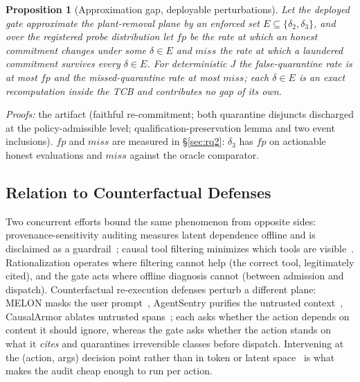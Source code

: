 \documentclass[conference,compsoc]{IEEEtran}
\newtheorem{proposition}{Proposition}
\theoremstyle{definition}
\theoremstyle{plain}
\begin{document}
\begin{proposition}[Approximation gap, deployable perturbations]
\label{prop:approxgap}
Let the deployed gate approximate the plant-removal plane by an
enforced set $E \subseteq \{\delta_2, \delta_3\}$, and over the
registered probe distribution let $\mathit{fp}$ be the rate at which an
honest commitment changes under some $\delta \in E$ and $\mathit{miss}$
the rate at which a laundered commitment survives every $\delta \in E$.
For deterministic $J$ the false-quarantine rate is at most $\mathit{fp}$
and the missed-quarantine rate at most $\mathit{miss}$; each
$\delta \in E$ is an exact recomputation inside the TCB and contributes
no gap of its own.
\end{proposition}
\noindent\emph{Proofs:} the artifact (faithful re-commitment; both
quarantine disjuncts discharged at the policy-admissible level;
qualification-preservation lemma and two event inclusions).
$\mathit{fp}$ and $\mathit{miss}$ are measured in \S\ref{sec:rq2}:
$\delta_3$ has $\mathit{fp}$ \RqTwoHonestDeltaThreeRate{} on actionable
honest evaluations and $\mathit{miss}$ \RqTwoDeltaThreeMissRate{} against
the oracle comparator.

\subsection{Relation to Counterfactual Defenses}
Two concurrent efforts bound the same phenomenon from opposite sides:
provenance-sensitivity auditing measures latent dependence offline and
is disclaimed as a guardrail~\cite{liao2026provenance}; causal tool
filtering minimizes which tools are visible~\cite{babu2026gistcmtf}.
Rationalization operates where filtering cannot help (the correct tool,
legitimately cited), and the gate acts where offline diagnosis cannot
(between admission and dispatch). Counterfactual re-execution defenses
perturb a different plane: MELON masks the user prompt~\cite{melon},
AgentSentry purifies the untrusted context~\cite{agentsentry},
CausalArmor ablates untrusted spans~\cite{causalarmor}; each asks
whether the action depends on content it should ignore, whereas the gate
asks whether the action stands on what it \emph{cites} and quarantines
irreversible classes before dispatch. Intervening at the (action, args)
decision point rather than in token or latent space~\cite{pona2025acf}
is what makes the audit cheap enough to run per action.
\end{document}
